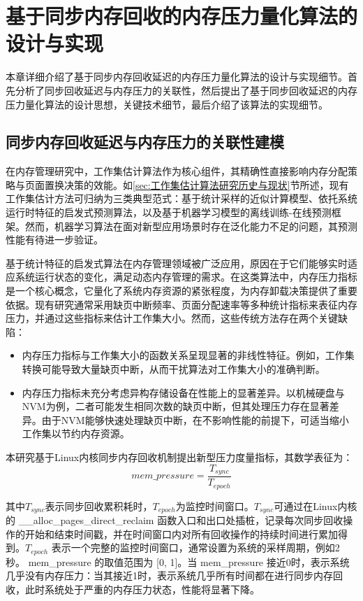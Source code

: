 \chapter{基于同步内存回收的内存压力量化算法的设计与实现}
\label{chap:基于同步内存回收的内存压力量化算法的设计与实现}
本章详细介绍了基于同步内存回收延迟的内存压力量化算法的设计与实现细节。首先分析了同步回收延迟与内存压力的关联性，然后提出了基于同步回收延迟的内存压力量化算法的设计思想，关键技术细节，最后介绍了该算法的实现细节。

\section{同步内存回收延迟与内存压力的关联性建模}

在内存管理研究中，工作集估计算法作为核心组件，其精确性直接影响内存分配策略与页面置换决策的效能。如\ref{sec:工作集估计算法研究历史与现状}节所述，现有工作集估计方法可归纳为三类典型范式：基于统计采样的近似计算模型、依托系统运行时特征的启发式预测算法，以及基于机器学习模型的离线训练-在线预测框架。然而，机器学习算法在面对新型应用场景时存在泛化能力不足的问题，其预测性能有待进一步验证。

基于统计特征的启发式算法在内存管理领域被广泛应用，原因在于它们能够实时适应系统运行状态的变化，满足动态内存管理的需求。在这类算法中，内存压力指标是一个核心概念，它量化了系统内存资源的紧张程度，为内存卸载决策提供了重要依据。现有研究通常采用缺页中断频率、页面分配速率等多种统计指标来表征内存压力，并通过这些指标来估计工作集大小。然而，这些传统方法存在两个关键缺陷：

\begin{itemize}
    \item 内存压力指标与工作集大小的函数关系呈现显著的非线性特征。例如，工作集转换可能导致大量缺页中断，从而干扰算法对工作集大小的准确判断。
    \item 内存压力指标未充分考虑异构存储设备在性能上的显著差异。以机械硬盘与NVM为例，二者可能发生相同次数的缺页中断，但其处理压力存在显著差异。由于NVM能够快速处理缺页中断，在不影响性能的前提下，可适当缩小工作集以节约内存资源。
\end{itemize}

本研究基于Linux内核同步内存回收机制提出新型压力度量指标，其数学表征为：
\begin{equation}
    \label{eq:mem_pressure}
    mem\_pressure = \frac{T_{sync}}{T_{epoch}}
\end{equation}

其中\(T_{sync}\)表示同步回收累积耗时，\(T_{epoch}\)为监控时间窗口。\(T_{sync}\)可通过在Linux内核的 \_\_alloc\_pages\_direct\_reclaim 函数入口和出口处插桩，记录每次同步回收操作的开始和结束时间戳，并在时间窗口内对所有回收操作的持续时间进行累加得到。\(T_{epoch}\) 表示一个完整的监控时间窗口，通常设置为系统的采样周期，例如2秒。 mem\_pressure 的取值范围为 [0, 1]。当 mem\_pressure 接近0时，表示系统几乎没有内存压力：当其接近1时，表示系统几乎所有时间都在进行同步内存回收，此时系统处于严重的内存压力状态，性能将显著下降。

